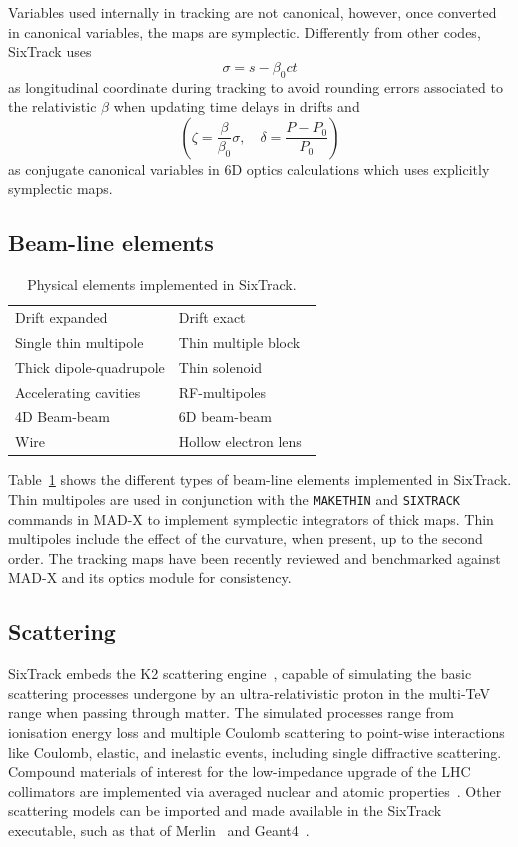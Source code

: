 \documentclass[a4paper,
              ]{jacow}
\begin{document}
Variables used internally in tracking are not canonical, however, once converted in canonical variables, the maps are symplectic.
Differently from other codes, SixTrack uses
\[
\sigma=s - \beta_0 c t
\]
as longitudinal coordinate during tracking to avoid rounding errors associated to the relativistic $\beta$ when updating time delays in drifts and
\[
\left(\zeta=\frac{\beta}{\beta_0} \sigma, \quad \delta=\frac{P-P_0}{P_0}\right)
\]
as conjugate canonical variables in 6D optics calculations which uses explicitly symplectic maps.


\subsection{Beam-line elements}

\begin{table}[ht]
    \centering
    \begin{tabular}{l|l}
        \hline
         Drift expanded & Drift exact~\cite{fjellstrom13} \\
         Single thin multipole &  Thin multiple block \\
         Thick dipole-quadrupole & Thin solenoid \\
         Accelerating cavities &  RF-multipoles~\cite{rf_multipoles}\\
         4D Beam-beam & 6D beam-beam~\cite{beam_beam}\\
         Wire~\cite{wire3} & Hollow electron lens~\cite{elens,elens3}\\
         \hline
    \end{tabular}
    \caption{Physical elements implemented in SixTrack.}
    \label{tab:tracking_elements}
\end{table}

Table~\ref{tab:tracking_elements} shows the different types of beam-line elements implemented in SixTrack. Thin multipoles are used in conjunction with the \texttt{MAKETHIN} and \texttt{SIXTRACK}  commands in MAD-X to implement symplectic integrators of thick maps.
Thin multipoles include the effect of the curvature, when present, up to the second order. The tracking maps have been recently reviewed and benchmarked against MAD-X and its optics module for consistency.

\subsection{Scattering}
SixTrack embeds the K2 scattering engine~\cite{K2,CTambascoThesis}, capable of simulating the basic scattering processes undergone by an ultra-relativistic proton in the multi-TeV range when passing through matter. The simulated processes range from ionisation energy loss and multiple Coulomb scattering to point-wise interactions like Coulomb, elastic, and inelastic events, including single diffractive scattering. Compound materials of interest for the low-impedance upgrade of the LHC collimators are implemented via averaged nuclear and atomic properties~\cite{EQuarantaThesis}. Other scattering models can be imported and made available in the SixTrack executable, such as  that of Merlin~\cite{merlin} and Geant4~\cite{geant4, MolsonIPAC17}.
\end{document}
